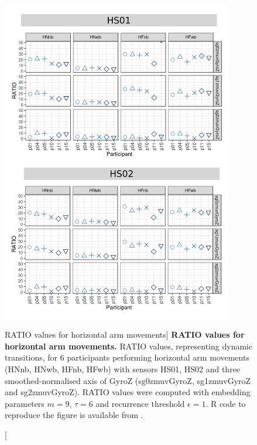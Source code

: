 \begin{figure}
\centering
\includegraphics[width=0.9\textwidth]{rqa_ratio_H_w500}
    \caption
	[RATIO values for horizontal arm movements]{
	{\bf RATIO values for horizontal arm movements.}	
	RATIO values, representing dynamic transitions, 
	for 6 participants performing horizontal arm movements 
	(HNnb, HNwb, HFnb, HFwb)
	with sensors HS01, HS02 and three smoothed-normalised axis 
	of GyroZ (sg0zmuvGyroZ, sg1zmuvGyroZ and sg2zmuvGyroZ).
	RATIO values were computed with 
	embedding parameters $m=9$, $\tau=6$ and recurrence threshold
	$\epsilon=1$.
	R code to reproduce the figure is available from \cite{hwum2018}.
        }
    \label{fig:rqa_ratio_H}
\end{figure}
